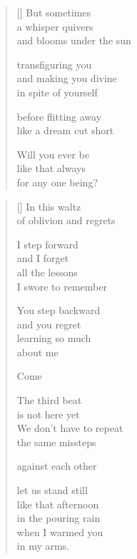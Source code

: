 \documentclass[14pt]{extbook}
\newcommand*{\centeredornament}{\centerline{\pgfornament[width=6cm]{88}}}
\begin{document}
\newpage

\begin{verse}[\versewidth]
  But sometimes \\
  a whisper quivers \\
  and blooms under the sun

  transfiguring you \\
  and making you divine \\
  in spite of yourself

  before flitting away \\
  like a dream cut short

  Will you ever be \\
  like that always \\
  for any one being?
\end{verse}


\newpage

\vspace*{-15mm}
\centeredornament
\vspace*{-7mm}


\settowidth{\versewidth}{We don't have to repeat}

\begin{verse}[\versewidth]
  In this waltz \\
  of oblivion and regrets

  I step forward \\
  and I forget \\
  all the lessons \\
  I swore to remember

  You step backward \\
  and you regret \\
  learning so much \\
  about me

  Come

  The third beat \\
  is not here yet \\
  We don't have to repeat \\
  the same missteps

  against each other

  let us stand still \\
  like that afternoon \\
  in the pouring rain \\
  when I warmed you \\
  in my arms.
\end{verse}
\end{document}
